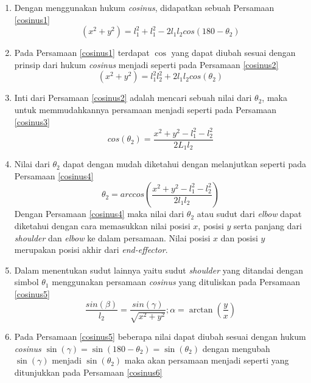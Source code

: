 \begin{enumerate}
	\item Dengan menggunakan hukum \textit{cosinus}, didapatkan sebuah Persamaan \ref{cosinus1}
	\begin{equation}
	(x^2+y^2)=l_{1}^2+l_{1}^2-2l_{1}l_{2}cos(180-\theta_{2})
	\label{cosinus1}
	\end{equation}
	\item Pada Persamaan \ref{cosinus1} terdapat $\cos$ yang dapat diubah sesuai dengan prinsip dari hukum \textit{cosinus} menjadi seperti pada Persamaan \ref{cosinus2}
	\begin{equation}
	(x^2+y^2)=l_{1}^2l_{2}^2+2l_{1}l_{2}cos(\theta_{2})
	\label{cosinus2}
	\end{equation}
	\item Inti dari Persamaan \ref{cosinus2} adalah mencari sebuah nilai dari $\theta_{2}$, maka untuk memmudahkannya persamaan menjadi seperti pada Persamaan \ref{cosinus3}
	\begin{equation}
	cos(\theta_{2})=\frac{x^2+y^2-l_{1}^2-l_{2}^2}{2L_{1}l_{2}}
	\label{cosinus3}
	\end{equation}
	\item Nilai dari $\theta_{2}$ dapat dengan mudah diketahui dengan melanjutkan seperti pada Persamaan \ref{cosinus4}
	\begin{equation}
	\theta_{2}=arccos(\frac{x^2+y^2-l_{1}^2-l_{2}^2}{2l_{1}l_{2}})
	\label{cosinus4}
	\end{equation}
	Dengan Persamaan \ref{cosinus4} maka nilai dari $\theta_{2}$ atau sudut dari \textit{elbow} dapat diketahui dengan cara memasukkan nilai posisi $x$, posisi $y$ serta panjang dari \textit{shoulder} dan \textit{elbow} ke dalam persamaan. Nilai posisi $x$ dan posisi $y$ merupakan posisi akhir dari \textit{end-effector}. 
	\item Dalam menentukan sudut lainnya yaitu sudut \textit{shoulder} yang ditandai dengan simbol $\theta_{1}$ menggunakan persamaan \textit{cosinus} yang dituliskan pada Persamaan \ref{cosinus5}
	\begin{equation}
	\frac{sin(\beta)}{l_{2}} = \frac{sin(\gamma)}{\sqrt{x^2+y^2}} ; \alpha=\arctan(\frac{y}{x})
	\label{cosinus5}
	\end{equation}
	\item Pada Persamaan \ref{cosinus5} beberapa nilai dapat diubah sesuai dengan hukum \textit{cosinus} $\sin(\gamma)=\sin(180-\theta_{2})=\sin(\theta_{2})$ dengan mengubah $\sin(\gamma)$ menjadi $\sin(\theta_{2})$ maka akan persamaan menjadi seperti yang ditunjukkan pada Persamaan \ref{cosinus6}

\end{enumerate}
